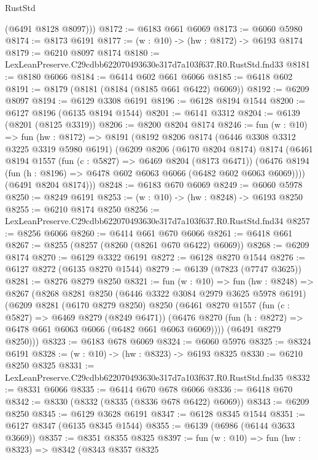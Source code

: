 \begin{lexlean}{RustStd}
\begin{coremodule}
        (@6491 @8128 @8097)))
@8172 := @6183 @661 @6069
@8173 := @6060 @5980
@8174 := @8173 @6191
@8177 := (w : @10) -> (hw : @8172) -> @6193 @8174
@8179 := @6210 @8097 @8174
@8180 := LexLeanPreserve.C29cdbb622070493630e317d7a103f637.R0.RustStd.fnd33
@8181 := @8180 @6066
@8184 := @6414 @602 @661 @6066
@8185 := @6418 @602
@8191 := @8179 (@8181 (@8184 (@8185 @661 @6422) @6069))
@8192 := @6209 @8097
@8194 := @6129 @3308 @6191
@8196 := @6128 @8194 @1544
@8200 := @6127 @8196 (@6135 @8194 @1544)
@8201 := @6141 @3312
@8204 := @6139 (@8201 (@8125 @3319))
@8206 := @8200 @8204 @8174
@8246 := fun (w : @10) =>
  fun (hw : @8172) =>
  @8191
    (@8192
      @8206
      @8174
      (@6446 @3308 @3312 @3225 @3319 @5980 @6191)
      (@6209
        @8206
        (@6170 @8204 @8174)
        @8174
        (@6461
          @8194
          @1557
          (fun (c : @5827) => @6469 @8204 (@8173 @6471))
          (@6476 @8194 (fun (h : @8196) => @6478 @602 @6063 @6066 (@6482 @602 @6063 @6069))))
        (@6491 @8204 @8174)))
@8248 := @6183 @670 @6069
@8249 := @6060 @5978
@8250 := @8249 @6191
@8253 := (w : @10) -> (hw : @8248) -> @6193 @8250
@8255 := @6210 @8174 @8250
@8256 := LexLeanPreserve.C29cdbb622070493630e317d7a103f637.R0.RustStd.fnd34
@8257 := @8256 @6066
@8260 := @6414 @661 @670 @6066
@8261 := @6418 @661
@8267 := @8255 (@8257 (@8260 (@8261 @670 @6422) @6069))
@8268 := @6209 @8174
@8270 := @6129 @3322 @6191
@8272 := @6128 @8270 @1544
@8276 := @6127 @8272 (@6135 @8270 @1544)
@8279 := @6139 (@7823 (@7747 @3625))
@8281 := @8276 @8279 @8250
@8321 := fun (w : @10) =>
  fun (hw : @8248) =>
  @8267
    (@8268
      @8281
      @8250
      (@6446 @3322 @3084 @2979 @3625 @5978 @6191)
      (@6209
        @8281
        (@6170 @8279 @8250)
        @8250
        (@6461
          @8270
          @1557
          (fun (c : @5827) => @6469 @8279 (@8249 @6471))
          (@6476 @8270 (fun (h : @8272) => @6478 @661 @6063 @6066 (@6482 @661 @6063 @6069))))
        (@6491 @8279 @8250)))
@8323 := @6183 @678 @6069
@8324 := @6060 @5976
@8325 := @8324 @6191
@8328 := (w : @10) -> (hw : @8323) -> @6193 @8325
@8330 := @6210 @8250 @8325
@8331 := LexLeanPreserve.C29cdbb622070493630e317d7a103f637.R0.RustStd.fnd35
@8332 := @8331 @6066
@8335 := @6414 @670 @678 @6066
@8336 := @6418 @670
@8342 := @8330 (@8332 (@8335 (@8336 @678 @6422) @6069))
@8343 := @6209 @8250
@8345 := @6129 @3628 @6191
@8347 := @6128 @8345 @1544
@8351 := @6127 @8347 (@6135 @8345 @1544)
@8355 := @6139 (@6986 (@6144 @3633 @3669))
@8357 := @8351 @8355 @8325
@8397 := fun (w : @10) =>
  fun (hw : @8323) =>
  @8342
    (@8343
      @8357
      @8325

\end{coremodule}
\end{lexlean}
